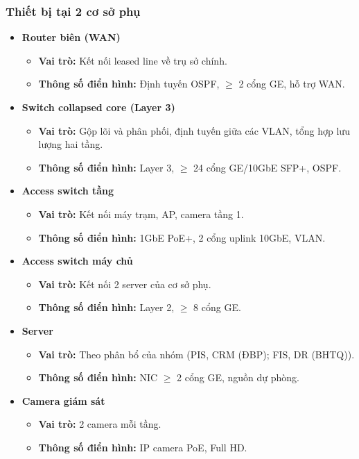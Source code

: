 \subsubsection{Thiết bị tại 2 cơ sở phụ}
\begin{itemize}
    \item \textbf{Router biên (WAN)}
    \begin{itemize}
        \item \textbf{Vai trò:} Kết nối leased line về trụ sở chính.
        \item \textbf{Thông số điển hình:} Định tuyến OSPF, $\geq$ 2 cổng GE, hỗ trợ WAN.
    \end{itemize}

    \item \textbf{Switch collapsed core (Layer 3)}
    \begin{itemize}
        \item \textbf{Vai trò:} Gộp lõi và phân phối, định tuyến giữa các VLAN, tổng hợp lưu lượng hai tầng.
        \item \textbf{Thông số điển hình:} Layer 3, $\geq$ 24 cổng GE/10GbE SFP+, OSPF.
    \end{itemize}

    \item \textbf{Access switch tầng}
    \begin{itemize}
        \item \textbf{Vai trò:} Kết nối máy trạm, AP, camera tầng 1.
        \item \textbf{Thông số điển hình:} 1GbE PoE+, 2 cổng uplink 10GbE, VLAN.
    \end{itemize}

    \item \textbf{Access switch máy chủ}
    \begin{itemize}
        \item \textbf{Vai trò:} Kết nối 2 server của cơ sở phụ.
        \item \textbf{Thông số điển hình:} Layer 2, $\geq$ 8 cổng GE.
    \end{itemize}

    \item \textbf{Server}
    \begin{itemize}
        \item \textbf{Vai trò:} Theo phân bổ của nhóm (PIS, CRM (ĐBP); FIS, DR (BHTQ)).
        \item \textbf{Thông số điển hình:} NIC $\geq$ 2 cổng GE, nguồn dự phòng.
    \end{itemize}

    \item \textbf{Camera giám sát}
    \begin{itemize}
        \item \textbf{Vai trò:} 2 camera mỗi tầng.
        \item \textbf{Thông số điển hình:} IP camera PoE, Full HD.
    \end{itemize}
\end{itemize}

